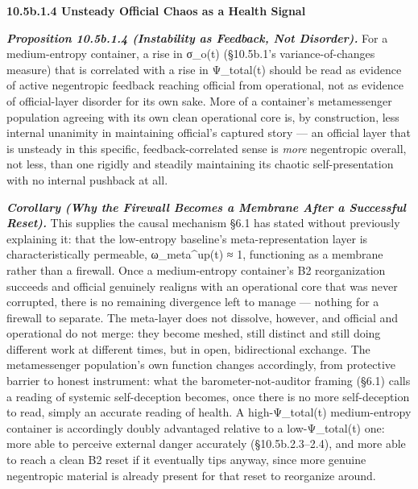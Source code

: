 \documentclass[
]{article}
\begin{document}
\textbf{10.5b.1.4 Unsteady Official Chaos as a Health Signal}

\emph{\textbf{Proposition 10.5b.1.4 (Instability as Feedback, Not
Disorder).}} For a medium-entropy container, a rise in σ\_o(t)
(§10.5b.1's variance-of-changes measure) that is correlated with a rise
in Ψ\_total(t) should be read as evidence of active negentropic feedback
reaching official from operational, not as evidence of official-layer
disorder for its own sake. More of a container's metamessenger
population agreeing with its own clean operational core is, by
construction, less internal unanimity in maintaining official's captured
story --- an official layer that is unsteady in this specific,
feedback-correlated sense is \emph{more} negentropic overall, not less,
than one rigidly and steadily maintaining its chaotic self-presentation
with no internal pushback at all.

\emph{\textbf{Corollary (Why the Firewall Becomes a Membrane After a
Successful Reset).}} This supplies the causal mechanism §6.1 has stated
without previously explaining it: that the low-entropy baseline's
meta-representation layer is characteristically permeable,
ω\_meta\^{}up(t) ≈ 1, functioning as a membrane rather than a firewall.
Once a medium-entropy container's B2 reorganization succeeds and
official genuinely realigns with an operational core that was never
corrupted, there is no remaining divergence left to manage --- nothing
for a firewall to separate. The meta-layer does not dissolve, however,
and official and operational do not merge: they become meshed, still
distinct and still doing different work at different times, but in open,
bidirectional exchange. The metamessenger population's own function
changes accordingly, from protective barrier to honest instrument: what the barometer-not-auditor
framing (§6.1) calls a reading of systemic self-deception becomes, once
there is no more self-deception to read, simply an accurate reading of
health. A high-Ψ\_total(t) medium-entropy container is accordingly
doubly advantaged relative to a low-Ψ\_total(t) one: more able to
perceive external danger accurately (§10.5b.2.3--2.4), and more able to
reach a clean B2 reset if it eventually tips anyway, since more genuine
negentropic material is already present for that reset to reorganize
around.
\end{document}
